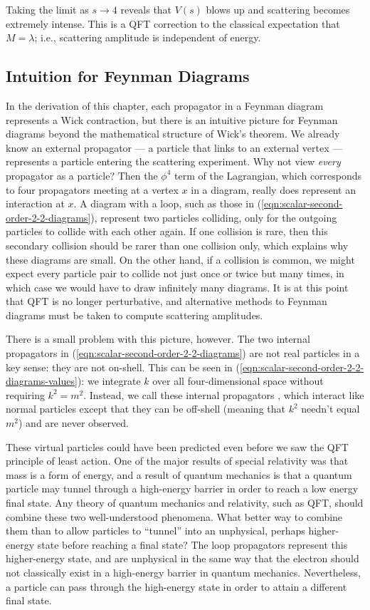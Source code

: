 Taking the limit as $s\rightarrow 4$ reveals that $V(s)$ blows up and scattering becomes extremely intense. This is a QFT correction to the classical expectation that $M = \lambda$; i.e., scattering amplitude is independent of energy.

\subsection{Intuition for Feynman Diagrams}

In the derivation of this chapter, each propagator in a Feynman diagram represents a Wick contraction, but there is an intuitive picture for Feynman diagrams beyond the mathematical structure of Wick's theorem. We already know an external propagator --- a particle that links to an external vertex --- represents a particle entering the scattering experiment. Why not view \textit{every} propagator as a particle? Then the $\phi^4$ term of the Lagrangian, which corresponds to four propagators meeting at a vertex $x$ in a diagram, really does represent an interaction at $x$. A diagram with a loop, such as those in (\ref{eqn:scalar-second-order-2-2-diagrams}), represent two particles colliding, only for the outgoing particles to collide with each other again. If one collision is rare, then this secondary collision should be rarer than one collision only, which explains why these diagrams are small. On the other hand, if a collision is common, we might expect every particle pair to collide not just once or twice but many times, in which case we would have to draw infinitely many diagrams. It is at this point that QFT is no longer perturbative, and alternative methods to Feynman diagrams must be taken to compute scattering amplitudes.

There is a small problem with this picture, however. The two internal propagators in (\ref{eqn:scalar-second-order-2-2-diagrams}) are not real particles in a key sense: they are not on-shell. This can be seen in (\ref{eqn:scalar-second-order-2-2-diagrams-values}): we integrate $k$ over all four-dimensional space without requiring $k^2=m^2$. Instead, we call these internal propagators , which interact like normal particles except that they can be off-shell (meaning that $k^2$ needn't equal $m^2$) and are never observed.

These virtual particles could have been predicted even before we saw the QFT principle of least action. One of the major results of special relativity was that mass is a form of energy, and a result of quantum mechanics is that a quantum particle may tunnel through a high-energy barrier in order to reach a low energy final state. Any theory of quantum mechanics and relativity, such as QFT, should combine these two well-understood phenomena. What better way to combine them than to allow particles to ``tunnel'' into an unphysical, perhaps higher-energy state before reaching a final state? The loop propagators represent this higher-energy state, and are unphysical in the same way that the electron should not classically exist in a high-energy barrier in quantum mechanics. Nevertheless, a particle can pass through the high-energy state in order to attain a different final state.

